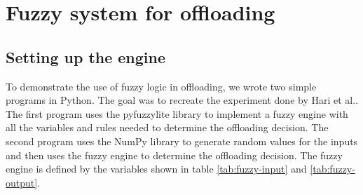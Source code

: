 \section{Fuzzy system for offloading}

\subsection{Setting up the engine}

To demonstrate the use of fuzzy logic in offloading, we wrote two simple programs in Python. The goal was to recreate the experiment done by Hari et
al.\cite{Hari-et-al-2018}. The first program uses the pyfuzzylite\cite{fuzzylite} library to implement a fuzzy engine with all the variables and
rules needed to determine the offloading decision. The second program uses the NumPy library to generate random values for the inputs and then uses
the fuzzy engine to determine the offloading decision. The fuzzy engine is defined by the variables shown in table \ref{tab:fuzzy-input} and
\ref{tab:fuzzy-output}.

